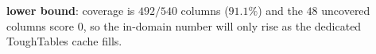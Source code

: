 \textbf{lower bound}: coverage is $492/540$ columns ($91.1\%$) and the $48$ uncovered
columns score $0$, so the in-domain number will only rise as the dedicated ToughTables
cache fills.


